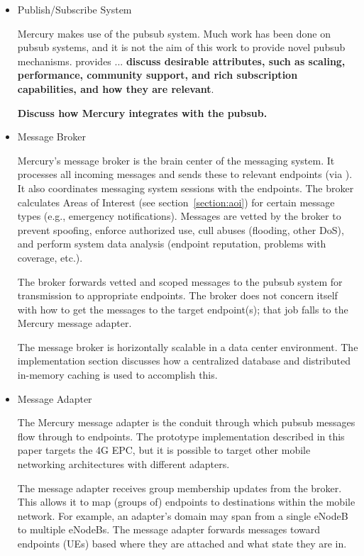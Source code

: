 \begin{itemize}

\item Publish/Subscribe System

Mercury makes use of the \pubsub pubsub system. Much work has been
done on pubsub systems, and it is not the aim of this work to provide
novel pubsub mechanisms. \pubsub provides ... {\bf discuss desirable
  attributes, such as scaling, performance, community support, and
  rich subscription capabilities, and how they are relevant}.

{\bf Discuss how Mercury integrates with the pubsub.}

\item Message Broker

Mercury's message broker is the brain center of the messaging
system. It processes all incoming messages and sends these to relevant
endpoints (via \pubsub). It also coordinates messaging system sessions
with the endpoints. The broker calculates Areas of Interest (see
section~\ref{section:aoi}) for certain message types (e.g., emergency
notifications).  Messages are vetted by the broker to prevent
spoofing, enforce authorized use, cull abuses (flooding, other DoS),
and perform system data analysis (endpoint reputation, problems with
coverage, etc.).

The broker forwards vetted and scoped messages to the pubsub system
for transmission to appropriate endpoints.  The broker does not
concern itself with how to get the messages to the target endpoint(s);
that job falls to the Mercury message adapter.

The message broker is horizontally scalable in a data center
environment. The implementation section discusses how a centralized
database and distributed in-memory caching is used to accomplish this.

\item Message Adapter

The Mercury message adapter is the conduit through which pubsub
messages flow through to endpoints. The prototype implementation
described in this paper targets the 4G EPC, but it is possible to
target other mobile networking architectures with different adapters.

The message adapter receives group membership updates from the
broker. This allows it to map (groups of) endpoints to destinations
within the mobile network.  For example, an adapter's domain may span
from a single eNodeB to multiple eNodeBs.  The message adapter
forwards messages toward endpoints (UEs) based where they are attached
and what state they are in.


\end{itemize}
